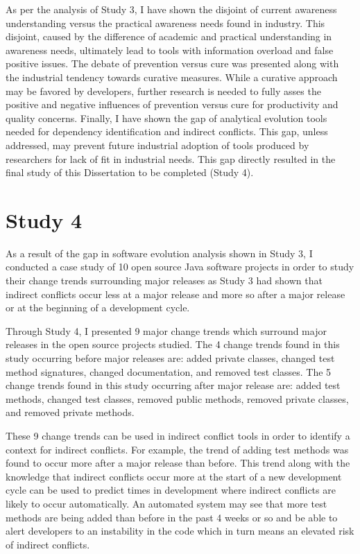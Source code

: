 As per the analysis of Study 3, I have shown the disjoint of current awareness understanding versus the practical
awareness needs found in industry. This disjoint, caused by the difference of academic and practical understanding in awareness needs,
ultimately lead to tools with information overload and false positive issues. The debate of prevention versus cure was presented along with
the industrial tendency towards curative measures. While a curative approach may be favored by developers, further research is needed
to fully asses the positive and negative influences of prevention versus cure for productivity and quality concerns. Finally, I have shown
the gap of analytical evolution tools needed for dependency identification and indirect conflicts. This gap, unless addressed, may prevent
future industrial adoption of tools produced by researchers for lack of fit in industrial needs. This gap directly resulted in the final
study of this Dissertation to be completed (Study 4).

\section{Study 4}

As a result of the gap in software evolution analysis shown in Study 3, I conducted a case study of 10 open source Java software 
projects in order to study their change trends surrounding
major releases as Study 3 had shown that indirect conflicts occur less at a major release and more so after a major release
or at the beginning of a development cycle. 

Through Study 4, I presented 9 major change trends which surround major releases in the open source
projects studied. The 4 change trends found in this study occurring before major releases are: added private classes, 
changed test method signatures, changed documentation, and removed test classes.
The 5 change trends found in this study occurring after major release are: added test methods, changed test classes, removed public methods, removed
private classes, and removed private methods.

These 9 change trends can be used in indirect conflict tools in order to identify a context for indirect conflicts.
For example, the trend of adding test methods was found to occur more after a major release than before. This trend along with
the knowledge that indirect conflicts occur more at the start of a new development cycle can be used to predict times in development
where indirect conflicts are likely to occur automatically. An automated system may see that more test methods are being added than
before in the past 4 weeks or so and be able to alert developers to an instability in the code which in turn means an elevated
risk of indirect conflicts.

